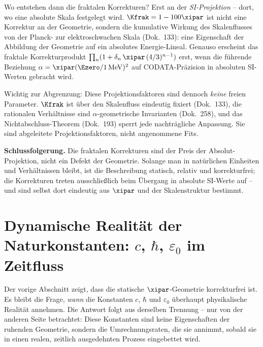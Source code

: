 Wo entstehen dann die fraktalen Korrekturen? Erst an der \emph{SI-Projektion} --
dort, wo eine absolute Skala festgelegt wird. $\Kfrak=1-100\xipar$ ist nicht eine
Korrektur an der Geometrie, sondern die kumulative Wirkung des Skalenflusses von
der Planck- zur elektroschwachen Skala (Dok.~133): eine Eigenschaft der Abbildung
der Geometrie auf ein absolutes Energie-Lineal. Genauso erscheint das fraktale
Korrekturprodukt $\prod_n(1+\delta_n\,\xipar\,(4/3)^{n-1})$ erst, wenn die führende
Beziehung $\alpha=\xipar(\Ezero/1\,\mathrm{MeV})^2$ auf CODATA-Präzision in
absoluten SI-Werten gebracht wird.

Wichtig zur Abgrenzung: Diese Projektionsfaktoren sind dennoch \emph{keine} freien
Parameter. $\Kfrak$ ist über den Skalenfluss eindeutig fixiert (Dok.~133), die
rationalen Verhältnisse sind $\alpha$-geometrische Invarianten (Dok.~258), und das
Nichtabschluss-Theorem (Dok.~193) sperrt jede nachträgliche Anpassung. Sie sind
abgeleitete Projektionsfaktoren, nicht angenommene Fits.

\begin{schlussfolgerung}
\textbf{Schlussfolgerung.} Die fraktalen Korrekturen sind der Preis der
Absolut-Projektion, nicht ein Defekt der Geometrie. Solange man in natürlichen
Einheiten und Verhältnissen bleibt, ist die Beschreibung statisch, relativ und
korrekturfrei; die Korrekturen treten ausschließlich beim Übergang in absolute
SI-Werte auf -- und sind selbst dort eindeutig aus $\xipar$ und der
Skalenstruktur bestimmt.
\end{schlussfolgerung}

\section{Dynamische Realität der Naturkonstanten: $c$, $\hbar$, $\varepsilon_0$ im Zeitfluss}
\label{sec:dyn-konstanten}

Der vorige Abschnitt zeigt, dass die statische $\xipar$-Geometrie korrekturfrei
ist. Es bleibt die Frage, \emph{wann} die Konstanten $c$, $\hbar$ und
$\varepsilon_0$ überhaupt physikalische Realität annehmen. Die Antwort folgt aus
derselben Trennung -- nur von der anderen Seite betrachtet: Diese Konstanten sind
keine Eigenschaften der ruhenden Geometrie, sondern die Umrechnungsraten, die sie
annimmt, sobald sie in einen realen, zeitlich ausgedehnten Prozess eingebettet
wird.

